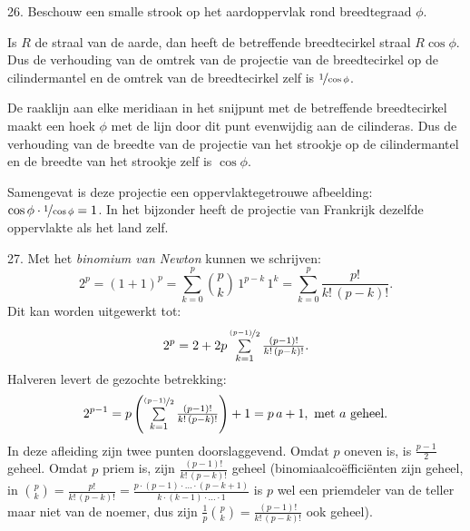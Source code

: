 \clearpage

\begin{problem}{26.}
    Beschouw een smalle strook op het aardoppervlak rond breedte\-graad $\phi$.

    Is $R$ de straal van de aarde, dan heeft de betreffende breedtecirkel straal $R \cos \phi$. Dus de verhouding van de omtrek van de projectie van de breedtecirkel op de cilindermantel en de omtrek van de breedte\-cirkel zelf is $\nicefrac{1}{\cos \phi}$.

    De raaklijn aan elke meridiaan in het snijpunt met de betreffende breedtecirkel maakt een hoek $\phi$ met de lijn door dit punt evenwijdig aan de cilinderas. Dus de verhouding van de breedte van de projectie van het strookje op de cilindermantel en de breedte van het strookje zelf is $\cos \phi$.

    Samengevat is deze projectie een oppervlaktegetrouwe afbeelding: $\cos \phi \cdot \nicefrac{1}{\cos \phi} = 1$. In het bijzonder heeft de projectie van Frankrijk dezelfde oppervlakte als het land zelf.
\end{problem}

\begin{problem}{27.}
    Met het \textit{binomium van Newton} kunnen we schrijven:
    \begin{equation*}
        2^p = {(1+1)}^p = \textstyle\sum\limits_{k=0}^{p} \binom{p}{k}\, 1^{p-k}\, 1^k = \textstyle\sum\limits_{k=0}^{p} \frac{p!}{k!\, (p-k)!}.
    \end{equation*}
    Dit kan worden uitgewerkt tot:
    \begin{equation*}
        2^p = 2 + 2 p \textstyle\sum\limits_{k=1}^{\nicefrac{(p-1)}{2}} \frac{(p-1)!}{k!\, (p-k)!}.
    \end{equation*}
    Halveren levert de gezochte betrekking:
    \begin{equation*}
        2^{p-1} = p \left( \textstyle\sum\limits_{k=1}^{\nicefrac{(p-1)}{2}} \frac{(p-1)!}{k!\, (p-k)!} \right) + 1 = p\, a + 1, \text{ met } a \text{ geheel}.
    \end{equation*}
    In deze afleiding zijn twee punten doorslaggevend. Omdat $p$ oneven is, is $\frac{p-1}{2}$ geheel. Omdat $p$ priem is, zijn $\frac{(p-1)!}{k!\, (p-k)!}$ geheel (binomiaal\-coëfficiënten zijn geheel, in $\binom{p}{k} = \frac{p!}{k!\, (p-k)!} = \frac{p \cdot (p-1) \cdot \dots \cdot (p-k+1)}{k \cdot (k-1) \cdot \dots \cdot 1}$ is $p$ wel een priemdeler van de teller maar niet van de noemer, dus zijn $\frac{1}{p} \binom{p}{k} = \frac{(p-1)!}{k!\, (p-k)!}$ ook geheel).
\end{problem}

